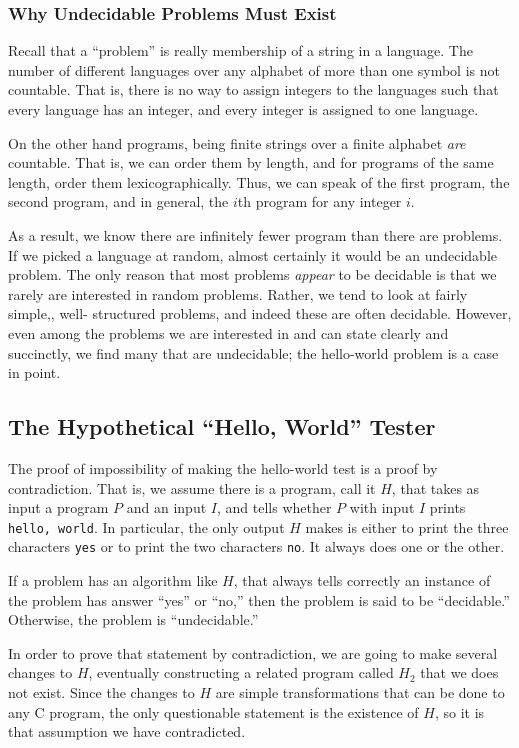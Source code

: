 \documentclass[]{article}
\begin{document}
\subsubsection*{Why Undecidable Problems Must Exist}
Recall that a ``problem'' is really membership of a string in a 
language. The number of different languages over any alphabet of more 
than one symbol is not countable. That is, there is no way to assign 
integers to the languages such that every language has an integer, and 
every integer is assigned to one language.

On the other hand programs, being finite strings over a finite alphabet
\emph{are} countable. That is, we can order them by length, and for
programs of the same length, order them lexicographically. Thus, we can
speak of the first program, the second program, and in general, the 
$i$th program for any integer $i$.

As a result, we know there are infinitely fewer program than there are
problems. If we picked a language at random, almost certainly it would 
be an undecidable problem. The only reason that most problems 
\emph{appear} to be decidable is that we rarely are interested in 
random problems. Rather, we tend to look at fairly simple,, well-
structured problems, and indeed these are often decidable. However, 
even among the problems we are interested in and can state clearly and 
succinctly, we find many that are undecidable; the hello-world problem 
is a case in point.

\subsection*{The Hypothetical ``Hello, World'' Tester}
The proof of impossibility of making the hello-world test is a proof by
contradiction. That is, we assume there is a program, call it $H$, that 
takes as input a program $P$ and an input $I$, and tells whether $P$ with 
input $I$ prints \texttt{hello, world}. In particular, the only output $H$ 
makes is either to print the three characters \texttt{yes} or to print the 
two characters \texttt{no}. It always does one or the other.

If a problem has an algorithm like $H$, that always tells correctly an 
instance of the problem has answer ``yes'' or ``no,'' then the problem is
said to be ``decidable.'' Otherwise, the problem is ``undecidable.''

In order to prove that statement by contradiction, we are going to make
several changes to $H$, eventually constructing a related program called
$H_2$ that we does not exist. Since the changes to $H$ are simple
transformations that can be done to any C program, the only questionable
statement is the existence of $H$, so it is that assumption we have
contradicted.
\end{document}
